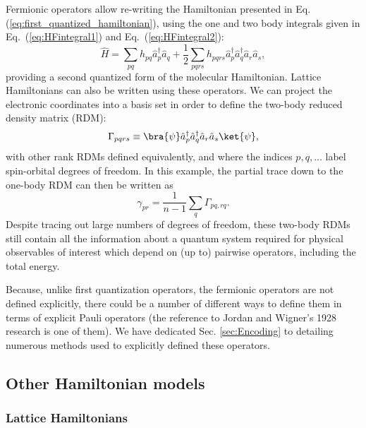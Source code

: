 Fermionic operators allow re-writing the Hamiltonian presented in Eq. (\ref{eq:first_quantized_hamiltonian}), using the one and two body integrals given in Eq.~(\ref{eq:HFintegral1}) and Eq.~(\ref{eq:HFintegral2}):
\begin{equation}
\label{eq:molecularhamiltonianladder}
\hat{H} =\sum_{p q} h_{p q} \hat{a}_{p}^{\dagger} \hat{a}_{q}+\frac{1}{2} \sum_{p q r s} h_{p q r s} \hat{a}_{p}^{\dagger} \hat{a}_{q}^{\dagger} \hat{a}_{r} \hat{a}_{s},
\end{equation}
providing a second quantized form of the molecular Hamiltonian. Lattice Hamiltonians can also be written using these operators. We can  project the electronic coordinates into a basis set in order to define the two-body reduced density matrix (RDM):
\begin{equation}
    \Gamma_{pqrs}
    \equiv
    \bra{\psi} \hat{a}_p^{\dagger}\hat{a}_q^{\dagger} \hat{a}_r \hat{a}_s \ket{\psi},
    \label{eq:two_body_rdm}
\end{equation}
with other rank RDMs defined equivalently, and where the indices $p, q, \dots$ label spin-orbital degrees of freedom. In this example, the partial trace down to the one-body RDM can then be written as
\begin{equation} \label{eq:one_body_rdm}
    \gamma_{pr} = \frac{1}{n-1}\sum_q\Gamma_{pq,rq}.
\end{equation}
Despite tracing out large numbers of degrees of freedom, these two-body RDMs still contain all the information about a quantum system required for physical observables of interest which depend on (up to) pairwise operators, including the total energy.

Because, unlike first quantization operators, the fermionic operators are not defined explicitly, there could be a number of different ways to define them in terms of explicit Pauli operators (the reference to Jordan and Wigner's 1928 research is one of them). We have dedicated Sec. \ref{sec:Encoding} to detailing numerous methods used to explicitly defined these operators. 

\subsection{Other Hamiltonian models}

\subsubsection{Lattice Hamiltonians} 

